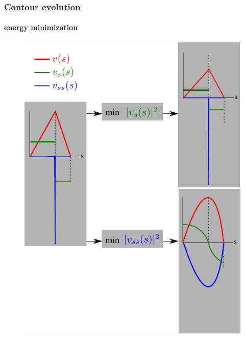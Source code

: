\begin{frame}
\frametitle{Contour evolution}
\framesubtitle{energy minimization}
\logoCSIPCPL\mypagenum
	\begin{figure}
		\includegraphics[height=0.8\textheight]{figs/TRK_contours.pdf}
	\end{figure}
\end{frame}



